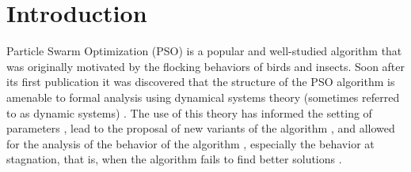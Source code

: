 \documentclass{sig-alternate}
\begin{document}

\section{Introduction}
\label{sec:intro}
Particle Swarm Optimization (PSO) is a popular and well-studied algorithm that was originally motivated by the flocking behaviors of birds and insects.
Soon after its first publication it was discovered that the structure of the PSO algorithm is amenable to formal analysis using dynamical systems theory (sometimes referred to as dynamic systems) \cite{985692}.
The use of this theory has informed the setting of parameters \cite{Trelea2003317,Jiang20078}, lead to the proposal of new variants of the algorithm \cite{985692}, and allowed for the analysis of the behavior of the algorithm \cite{Schmitt:2013:PSO:2463372.2463563}, especially the behavior at stagnation, that is, when the algorithm fails to find better solutions \cite{985692}.
\end{document}
